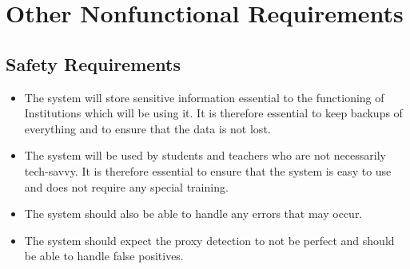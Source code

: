 \documentclass{scrreprt}
\begin{document}
\chapter{Other Nonfunctional Requirements}


\section{Safety Requirements}

\begin{itemize}
    \item The system will store sensitive information essential to the functioning of Institutions which will be using it.
        It is therefore essential to keep backups of everything and to ensure that the data is not lost.
    \item The system will be used by students and teachers who are not necessarily tech-savvy.
        It is therefore essential to ensure that the system is easy to use and does not require any special training.
    \item The system should also be able to handle any errors that may occur.
    \item The system should expect the proxy detection to not be perfect and should be able to handle false positives.

\end{itemize}

\end{document}
